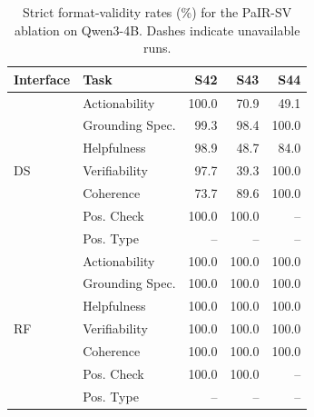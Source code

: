 \begin{table}[H]
\centering
\captionsetup{font=compacttable,skip=2pt}

{\fontsize{8.5pt}{9.2pt}\selectfont
\setlength{\tabcolsep}{1.5pt}
\renewcommand{\arraystretch}{0.82}
\begin{tabular*}{\columnwidth}{@{\extracolsep{\fill}}llrrr@{}}
\toprule
Interface & Task & S42 & S43 & S44 \\
\midrule
\multirow{7}{*}{DS}
& Actionability & 100.0 & 70.9 & 49.1 \\
& Grounding Spec. & 99.3 & 98.4 & 100.0 \\
& Helpfulness & 98.9 & 48.7 & 84.0 \\
& Verifiability & 97.7 & 39.3 & 100.0 \\
& Coherence & 73.7 & 89.6 & 100.0 \\
& Pos. Check & 100.0 & 100.0 & -- \\
& Pos. Type & -- & -- & -- \\
\midrule
\multirow{7}{*}{RF}
& Actionability & 100.0 & 100.0 & 100.0 \\
& Grounding Spec. & 100.0 & 100.0 & 100.0 \\
& Helpfulness & 100.0 & 100.0 & 100.0 \\
& Verifiability & 100.0 & 100.0 & 100.0 \\
& Coherence & 100.0 & 100.0 & 100.0 \\
& Pos. Check & 100.0 & 100.0 & -- \\
& Pos. Type & -- & -- & -- \\
\bottomrule
\end{tabular*}
}

\caption{Strict format-validity rates (\%) for the PaIR-SV ablation on
Qwen3-4B. Dashes indicate unavailable runs.}
\label{tab:ssa-v2-format-validity}
\end{table}

